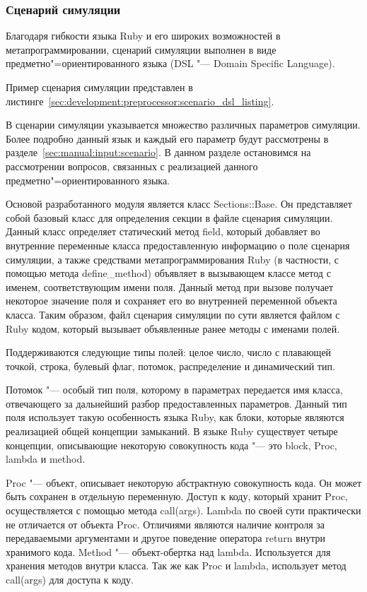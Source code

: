 \subsubsection{Сценарий симуляции}
\label{sec:development:preprocessor:scenario_dsl}

Благодаря гибкости языка Ruby и его широких возможностей в метапрограммировании,
сценарий симуляции выполнен в виде предметно"=ориентированного языка (DSL "--- Domain Specific Language).

Пример сценария симуляции представлен в листинге~\ref{sec:development:preprocessor:scenario_dsl_listing}.



В сценарии симуляции указывается множество различных параметров симуляции.
Более подробно данный язык и каждый его параметр будут рассмотрены в разделе~\ref{sec:manual:input:scenario}.
В данном разделе остановимся на рассмотрении вопросов, связанных с реализацией данного предметно"=ориентированного языка.

Основой разработанного модуля является класс Sections::Base. Он представляет собой базовый класс для определения секции в файле сценария симуляции.
Данный класс определяет статический метод field, который добавляет во внутренние переменные класса предоставленную информацию о поле сценария симуляции,
а также средствами метапрограммирования Ruby (в частности, с помощью метода define\_method) объявляет в вызывающем классе метод с именем, соответствующим имени поля.
Данный метод при вызове получает некоторое значение поля и сохраняет его во внутренней переменной объекта класса.
Таким образом, файл сценария симуляции по сути является файлом с Ruby кодом, который вызывает объявленные ранее методы с именами полей.

Поддерживаются следующие типы полей: целое число, число с плавающей точкой, строка, булевый флаг, потомок, распределение и динамический тип.

Потомок "--- особый тип поля, которому в параметрах передается имя класса, отвечающего за дальнейший разбор предоставленных параметров.
Данный тип поля использует такую особенность языка Ruby, как блоки, которые являются реализацией общей концепции замыканий.
В языке Ruby существует четыре концепции, описывающие некоторую совокупность кода "--- это block, Proc, lambda и method.

Proc "--- объект, описывает некоторую абстрактную совокупность кода. Он может быть сохранен в отдельную переменную. Доступ к коду, который хранит Proc, осуществляется с помощью метода call(args).
Lambda по своей сути практически не отличается от объекта Proc. Отличиями являются наличие контроля за передаваемыми аргументами и другое поведение оператора return внутри хранимого кода.
Method "--- объект-обертка над lambda. Используется для хранения методов внутри класса. Так же как Proc и lambda, использует метод call(args) для доступа к коду.

